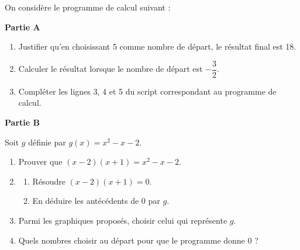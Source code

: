 \documentclass[exercice,a4]{thedocument}%
\begin{document}
%
On considère le programme de calcul suivant :

\begin{center}
\end{center}

\textbf{Partie A}
\begin{enumerate}
    \item Justifier qu'en choisissant 5 comme nombre de départ, le résultat
    final est 18.
    \item Calculer le résultat lorsque le nombre de départ est
    $-\dfrac32$.
    \item Compléter les lignes 3, 4 et 5 du script correspondant au
    programme de calcul.
\end{enumerate}

\textbf{Partie B}

Soit $g$ définie par $g(x)=x^2-x-2$.
\begin{enumerate}
    \item Prouver que $(x-2)(x+1)=x^2-x-2$.
    \item
    \begin{enumerate}
        \item Résoudre $(x-2)(x+1)=0$.
        \item En déduire les antécédents de 0 par $g$.
    \end{enumerate}
    \item Parmi les graphiques proposés, choisir celui qui représente $g$.
    \item Quels nombres choisir au départ pour que le programme donne 0 ?
\end{enumerate}
\showthesource
\end{document}

